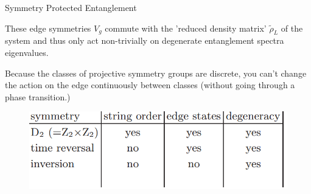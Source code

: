 \begin{frame}{Symmetry Protected Entanglement}
\vskip-1.5cm
\bi 
\item These edge symmetries $V_g$ commute with the 'reduced density matrix' $\tilde{\rho}_L$ of the system and thus only act non-trivially on degenerate entanglement spectra eigenvalues. 

\item Because the classes of projective symmetry groups are discrete, you can't change the action on the edge continuously between classes (without going through a phase transition.)
\ei 
\begin{figure}
\includegraphics[width=\textwidth]{diagrams/akltchart.png}
\end{figure}
\end{frame}